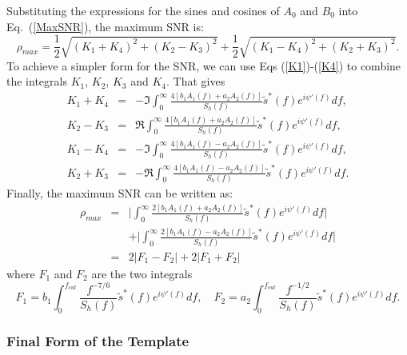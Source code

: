 Substituting the expressions for the sines and cosines of $A_0$ and
$B_0$
into Eq.~(\ref{MaxSNR}), the maximum SNR is:
\begin{equation}
 \rho_{max} = \frac{1}{2} \sqrt{(K_1+K_4)^2 + (K_2-K_3)^2} +
\frac{1}{2} \sqrt{(K_1-K_4)^2 +(K_2+K_3)^2}.
\end{equation}
To achieve a simpler form for the SNR, we can use Eqs (\ref{K1})-(\ref{K4}) to 
combine the integrals $K_1$, $K_2$, $K_3$ and
$K_4$.  
That gives
\begin{eqnarray}
K_1 + K_4 &=& - \Im \int_0^{\infty}  \frac{4 [b_1 A_1(f) + a_2 A_2(f)]}{S_h(f)}
\tilde{s}^{\ast}(f) e^{i \psi'(f)} df, \\
K_2 - K_3 &=& \Re \int_0^{\infty}  \frac{4[b_1 A_1(f) + a_2 A_2(f)]}{S_h(f)}
\tilde{s}^{\ast}(f) e^{i \psi'(f)} df,\\
K_1 - K_4 &=& - \Im \int_0^{\infty}  \frac{4[b_1 A_1(f) - a_2 A_2(f)]}{S_h(f)}
\tilde{s}^{\ast}(f) e^{i \psi'(f)} df, \\
K_2 + K_3 &=& - \Re \int_0^{\infty}  \frac{4[b_1 A_1(f) - a_2 A_2(f)]}{S_h(f)}
\tilde{s}^{\ast}(f) e^{i \psi'(f)} df.
\end{eqnarray}
Finally, the maximum SNR can be written as:
\begin{eqnarray}
\rho_{max} &=&  \Bigg | \int_0^{\infty} \frac{2 [b_1
A_1(f) + a_2 A_2(f)]}{S_h(f)} \tilde{s}^{\ast}(f) e^{i \psi'(f)} df \Bigg | \\
 && + \Bigg |
\int_0^{\infty} \frac{2[b_1 A_1(f) - a_2 A_2(f)]}{S_h(f)} \tilde{s}^{\ast}(f)
e^{i \psi'(f)} df \Bigg | \\
        &=& 2| F_1 -  F_2 | + 2| F_1 + F_2 |
\label{rhomax}
\end{eqnarray}
where $F_1$ and $F_2$ are the two integrals 
\begin{equation}
F_{1} = b_1 \int_0^{f_{cut}} \frac{ f^{-7/6}}
{S_h(f)} \tilde{s}^{\ast}(f) e^{i \psi'(f)} df , \quad
F_{2} = a_2 \int_0^{f_{cut}} \frac{ f^{-1/2}}
{S_h(f)} \tilde{s}^{\ast}(f) e^{i \psi'(f)} df .
\end{equation}

\subsubsection*{Final Form of the Template}
\label{FinalForm}

